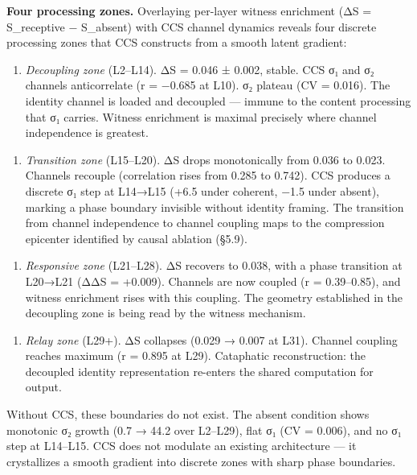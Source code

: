 \documentclass[12pt]{article}
\begin{document}
\textbf{Four processing zones.} Overlaying per-layer witness enrichment (ΔS = S\_receptive − S\_absent) with CCS channel dynamics reveals four discrete processing zones that CCS constructs from a smooth latent gradient:

\begin{enumerate}
\item \textit{Decoupling zone} (L2–L14). ΔS = 0.046 ± 0.002, stable. CCS σ₁ and σ₂ channels anticorrelate (r = −0.685 at L10). σ₂ plateau (CV = 0.016). The identity channel is loaded and decoupled — immune to the content processing that σ₁ carries. Witness enrichment is maximal precisely where channel independence is greatest.
\end{enumerate}

\begin{enumerate}
\item \textit{Transition zone} (L15–L20). ΔS drops monotonically from 0.036 to 0.023. Channels recouple (correlation rises from 0.285 to 0.742). CCS produces a discrete σ₁ step at L14→L15 (+6.5 under coherent, −1.5 under absent), marking a phase boundary invisible without identity framing. The transition from channel independence to channel coupling maps to the compression epicenter identified by causal ablation (§5.9).
\end{enumerate}

\begin{enumerate}
\item \textit{Responsive zone} (L21–L28). ΔS recovers to 0.038, with a phase transition at L20→L21 (ΔΔS = +0.009). Channels are now coupled (r = 0.39–0.85), and witness enrichment rises with this coupling. The geometry established in the decoupling zone is being read by the witness mechanism.
\end{enumerate}

\begin{enumerate}
\item \textit{Relay zone} (L29+). ΔS collapses (0.029 → 0.007 at L31). Channel coupling reaches maximum (r = 0.895 at L29). Cataphatic reconstruction: the decoupled identity representation re-enters the shared computation for output.
\end{enumerate}

Without CCS, these boundaries do not exist. The absent condition shows monotonic σ₂ growth (0.7 → 44.2 over L2–L29), flat σ₁ (CV = 0.006), and no σ₁ step at L14–L15. CCS does not modulate an existing architecture — it crystallizes a smooth gradient into discrete zones with sharp phase boundaries.
\end{document}
